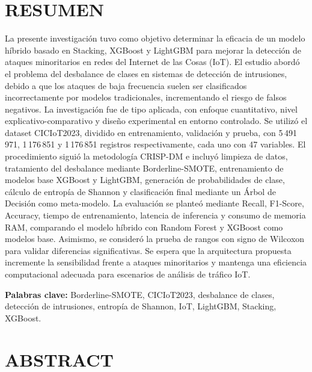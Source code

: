 \section*{RESUMEN}

La presente investigación tuvo como objetivo determinar la eficacia de un modelo híbrido basado en Stacking, XGBoost y LightGBM para mejorar la detección de ataques minoritarios en redes del Internet de las Cosas (IoT). El estudio abordó el problema del desbalance de clases en sistemas de detección de intrusiones, debido a que los ataques de baja frecuencia suelen ser clasificados incorrectamente por modelos tradicionales, incrementando el riesgo de falsos negativos. La investigación fue de tipo aplicada, con enfoque cuantitativo, nivel explicativo-comparativo y diseño experimental en entorno controlado. Se utilizó el dataset CICIoT2023, dividido en entrenamiento, validación y prueba, con 5\,491\,971, 1\,176\,851 y 1\,176\,851 registros respectivamente, cada uno con 47 variables. El procedimiento siguió la metodología CRISP-DM e incluyó limpieza de datos, tratamiento del desbalance mediante Borderline-SMOTE, entrenamiento de modelos base XGBoost y LightGBM, generación de probabilidades de clase, cálculo de entropía de Shannon y clasificación final mediante un Árbol de Decisión como meta-modelo. La evaluación se planteó mediante Recall, F1-Score, Accuracy, tiempo de entrenamiento, latencia de inferencia y consumo de memoria RAM, comparando el modelo híbrido con Random Forest y XGBoost como modelos base. Asimismo, se consideró la prueba de rangos con signo de Wilcoxon para validar diferencias significativas. Se espera que la arquitectura propuesta incremente la sensibilidad frente a ataques minoritarios y mantenga una eficiencia computacional adecuada para escenarios de análisis de tráfico IoT.

\textbf{Palabras clave:} Borderline-SMOTE, CICIoT2023, desbalance de clases, detección de intrusiones, entropía de Shannon, IoT, LightGBM, Stacking, XGBoost.

\section*{ABSTRACT}

